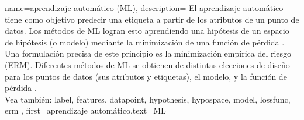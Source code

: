 {name={aprendizaje automático (ML)},
	description={
		El aprendizaje automático tiene como objetivo predecir
		una etiqueta a partir de los atributos de un punto de datos. Los métodos de ML logran esto
		aprendiendo una hipótesis de un espacio de hipótesis (o modelo)
		mediante la minimización de una función de pérdida \cite{MLBasics,HastieWainwrightBook}.
		Una formulación precisa de este principio es la minimización empírica del riesgo (ERM).
		Diferentes métodos de ML se obtienen de distintas elecciones de diseño para los
		puntos de datos (sus atributos y etiquetas),
		el modelo, y la función de pérdida \cite[Cap. 3]{MLBasics}.
		\\
		Vea también: \gls{label}, \gls{feature}s, \gls{datapoint}, \gls{hypothesis}, \gls{hypospace}, \gls{model}, \gls{lossfunc}, \gls{erm} },
	first={aprendizaje automático},text={ML}
}


